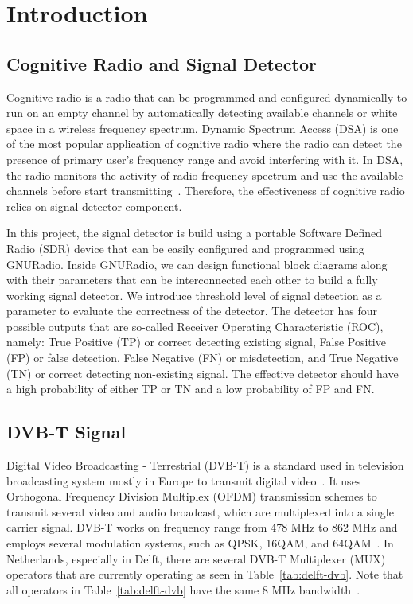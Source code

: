 \chapter{Introduction}

\section{Cognitive Radio and Signal Detector}

Cognitive radio is a radio that can be programmed and configured dynamically to run on an empty channel by automatically detecting available channels or white space in a wireless frequency spectrum. Dynamic Spectrum Access (DSA) is one of the most popular application of cognitive radio where the radio can detect the presence of primary user's frequency range and avoid interfering with it. In DSA, the radio monitors the activity of radio-frequency spectrum and use the available channels before start transmitting~\cite{o2007practical}. Therefore, the effectiveness of cognitive radio relies on signal detector component. 

In this project, the signal detector is build using a portable Software Defined Radio (SDR) device that can be easily configured and programmed using GNURadio. Inside GNURadio, we can design functional block diagrams along with their parameters that can be interconnected each other to build a fully working signal detector. We introduce threshold level of signal detection as a parameter to evaluate the correctness of the detector. The detector has four possible outputs that are so-called Receiver Operating Characteristic (ROC), namely: True Positive (TP) or correct detecting existing signal, False Positive (FP) or false detection, False Negative (FN) or misdetection, and True Negative (TN) or correct detecting non-existing signal. The effective detector should have a high probability of either TP or TN and a low probability of FP and FN.

\section{DVB-T Signal}

Digital Video Broadcasting - Terrestrial (DVB-T) is a standard used in television broadcasting system mostly in Europe to transmit digital video~\cite{ianPoole}. It uses Orthogonal Frequency Division Multiplex (OFDM) transmission schemes to transmit several video and audio broadcast, which are multiplexed into a single carrier signal. DVB-T works on frequency range from 478 MHz to 862 MHz and employs several modulation systems, such as QPSK, 16QAM, and 64QAM~\cite{riviello2013sensing}. In Netherlands, especially in Delft, there are several DVB-T Multiplexer (MUX) operators that are currently operating as seen in Table~\ref{tab:delft-dvb}. Note that all operators in Table~\ref{tab:delft-dvb} have the same 8 MHz bandwidth~\cite{radiotvnederland}.

